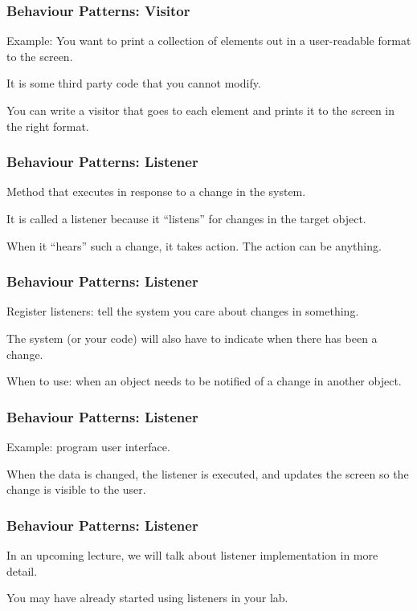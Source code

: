 \begin{frame}
\frametitle{Behaviour Patterns: Visitor}
\begin{changemargin}{1cm}

Example: You want to print a collection of elements out in a user-readable format to the screen. 

It is some third party code that you cannot modify.

You can write a visitor that goes to each element and prints it to the screen in the right format. 

\end{changemargin}
\end{frame}

\begin{frame}
\frametitle{Behaviour Patterns: Listener}
\begin{changemargin}{1cm}

Method that executes in response to a change in the system. 

It is called a listener because it ``listens'' for changes in the target object. 

When it ``hears'' such a change, it takes action. The action can be anything.

\end{changemargin}
\end{frame}

\begin{frame}
\frametitle{Behaviour Patterns: Listener}
\begin{changemargin}{1cm}

Register listeners: tell the system you care about changes in something.

The system (or your code) will also have to indicate when there has been a change.

When to use: when an object needs to be notified of a change in another object.

\end{changemargin}
\end{frame}

\begin{frame}
\frametitle{Behaviour Patterns: Listener}
\begin{changemargin}{1cm}

Example: program user interface. 

When the data is changed, the listener is executed, and updates the screen so the change is visible to the user.

\end{changemargin}
\end{frame}

\begin{frame}
\frametitle{Behaviour Patterns: Listener}
\begin{changemargin}{1cm}
In an upcoming lecture, we will talk about listener implementation in more detail.

You may have already started using listeners in your lab.
\end{changemargin}
\end{frame}


